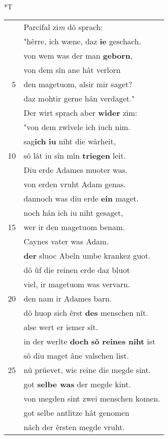 \documentclass[8pt,a4paper,notitlepage]{article}
\begin{document}
\begin{table}[ht]
\hspace{0.5cm}
\begin{minipage}[t]{0.5\linewidth}
\small
\begin{center}*T
\end{center}
\begin{tabular}{rl}
 & Parcifal zi\textit{m} dô sprach:\\ 
 & "hêrre, ich wæne, daz \textbf{ie} geschach.\\ 
 & von wem was der man \textbf{geborn},\\ 
 & von dem sîn ane hât verlorn\\ 
5 & den magetuom, alsir mir saget?\\ 
 & daz mohtir gerne hân verdaget."\\ 
 & Der wirt sprach aber \textbf{wider} zim:\\ 
 & "von dem zwîvele ich iuch nim.\\ 
 & sag\textbf{ich} \textbf{iu} niht die wârheit,\\ 
10 & sô lât iu sîn mîn \textbf{triegen} leit.\\ 
 & Diu erde Adames muoter was.\\ 
 & von erden vruht Adam genas.\\ 
 & dannoch was diu erde \textbf{ein} maget.\\ 
 & noch hân ich iu niht gesaget,\\ 
15 & wer ir den magetuom benam.\\ 
 & Caynes vater was Adam.\\ 
 & \textbf{der} sluoc Abeln umbe krankez guot.\\ 
 & dô ûf die reinen erde daz bluot\\ 
 & viel, ir magetuom was vervarn.\\ 
20 & den nam ir Adames barn.\\ 
 & dô huop sich êrst \textbf{des} menschen nît.\\ 
 & alse wert er iemer sît.\\ 
 & in der werlte \textbf{doch} \textbf{sô reines niht} ist\\ 
 & sô diu maget âne valschen list.\\ 
25 & nû prüevet, wie reine die megde sint.\\ 
 & got \textbf{selbe was} der megde kint.\\ 
 & von megden sint zwei menschen komen.\\ 
 & got selbe antlitze hât genomen\\ 
 & nâch der êrsten megde vruht.\\ 

\end{tabular}
\end{minipage}
\end{table}
\end{document}

